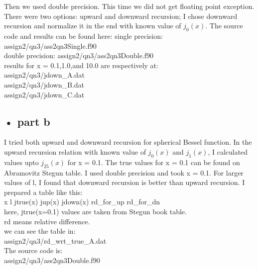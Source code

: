 \documentclass[11pt,a4paper,english]{article}
\begin{document}
		Then we used double precision. This time we did not get floating point exception.
		There were two options: upward and downward recursion; I chose downward recursion and normalize
		it in the end with known value of $j_0(x)$.
		The source code and results can be found here:
		single precision: assign2/qn3/ass2qn3Single.f90\\
		double precision: assign2/qn3/ass2qn3Double.f90\\
		
		results for x = 0.1,1.0,and 10.0 are respectively at:\\
		assign2/qn3/jdown\_A.dat \\
		assign2/qn3/jdown\_B.dat \\
		assign2/qn3/jdown\_C.dat \\
	
	
	\subsection{• part b}
		I tried both upward and downward recursion for spherical Bessel function.
		In the upward recursion relation with known value of $j_0(x)$ and $j_1(x)$,
		I calculated values upto $j_25(x)$ for x = 0.1.
		The true values for x = 0.1 can be found on Abramovitz Stegun table.
		I used double precision and took x = 0.1. For larger values of l, I found that
		downward recursion is better than upward recursion.
		I prepared a table like this:\\
		x l  jtrue(x)   jup(x)    jdown(x)    rd\_for\_up     rd\_for\_dn\\
		
		here, jtrue(x=0.1) values are taken from Stegun book table.\\
		rd means relative difference.\\
		we can see the table in:      \\
		assign2/qn3/rd\_wrt\_true\_A.dat  \\
		
		The source code is:\\
		assign2/qn3/ass2qn3Double.f90\\
		
	
\end{document}
